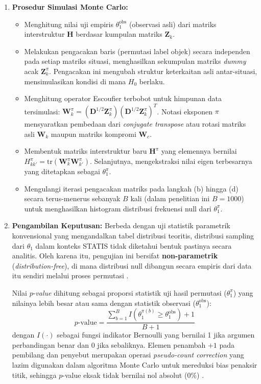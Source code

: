 \begin{enumerate}
    \item \textbf{Prosedur Simulasi Monte Carlo:}
    \begin{itemize}
        \item[a.] Menghitung nilai uji empiris $\theta_1^{\text{obs}}$ (observasi asli) dari matriks interstruktur $\mathbf{H}$ berdasar kumpulan matriks $\mathbf{Z}_k$.
        \item[b.] Melakukan pengacakan baris (permutasi label objek) secara independen pada setiap matriks situasi, menghasilkan sekumpulan matriks \textit{dummy} acak $\mathbf{Z}_k^{\pi}$. Pengacakan ini mengubah struktur keterkaitan asli antar-situasi, mensimulasikan kondisi di mana $H_0$ berlaku.
        \item[c.] Menghitung operator Escoufier terbobot untuk himpunan data tersimulasi: $\mathbf{W}_k^{\pi} = (\mathbf{D}^{1/2}\mathbf{Z}_k^{\pi})(\mathbf{D}^{1/2}\mathbf{Z}_k^{\pi})^T$. Notasi eksponen $\pi$ mensyaratkan pembedaan dari \textit{conjugate transpose} atau rotasi matriks asli $\mathbf{W}_k$ maupun matriks kompromi $\mathbf{W}_c$.
        \item[d.] Membentuk matriks interstruktur baru $\mathbf{H}^{\pi}$ yang elemennya bernilai $H_{kk'}^{\pi} = \mathrm{tr}(\mathbf{W}_k^{\pi} \mathbf{W}_{k'}^{\pi})$. Selanjutnya, mengekstraksi nilai eigen terbesarnya yang ditetapkan sebagai $\theta_1^{\pi}$.
        \item[e.] Mengulangi iterasi pengacakan matriks pada langkah (b) hingga (d) secara terus-menerus sebanyak $B$ kali (dalam penelitian ini $B = 1000$) untuk menghasilkan histogram distribusi frekuensi null dari $\theta_1^{\pi}$.
    \end{itemize}

    \item \textbf{Pengambilan Keputusan:}
    Berbeda dengan uji statistik parametrik konvensional yang mengandalkan tabel distribusi teoritis, distribusi sampling dari $\theta_1$ dalam konteks STATIS tidak diketahui bentuk pastinya secara analitis. Oleh karena itu, pengujian ini bersifat \textbf{non-parametrik} (\textit{distribution-free}), di mana distribusi null dibangun secara empiris dari data itu sendiri melalui proses permutasi \citep{kazi1995}.
    
    Nilai $p$-\textit{value} dihitung sebagai proporsi statistik uji hasil permutasi ($\theta_1^{\pi}$) yang nilainya lebih besar atau sama dengan statistik observasi ($\theta_1^{\text{obs}}$):
    \begin{equation}\label{eq:permutation}
        p\text{-value} = \frac{\displaystyle\sum_{b=1}^{B} I\left(\theta_1^{\pi(b)} \ge \theta_1^{\text{obs}}\right) + 1}{B + 1}
    \end{equation}
    dengan $I(\cdot)$ sebagai fungsi indikator Bernoulli yang bernilai 1 jika argumen perbandingan benar dan 0 jika sebaliknya. Elemen penambah $+1$ pada pembilang dan penyebut merupakan operasi \textit{pseudo-count correction} yang lazim digunakan dalam algoritma Monte Carlo untuk mereduksi bias penaksir titik, sehingga $p$-value eksak tidak bernilai nol absolut ($0\%$) \citep{phipson2010}.
    

\end{enumerate}
